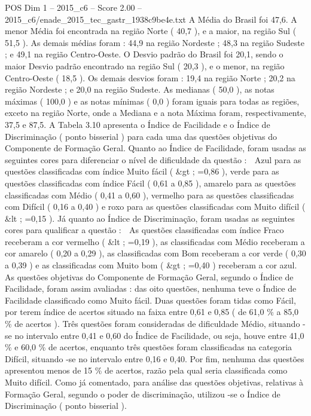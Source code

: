 \begin{textsample}{POS Dim 1 – 2015\_c6 – Score 2.00 – 2015\_c6/enade\_2015\_tec\_gastr\_1938c9be4e.txt}
A Média do Brasil foi 47,6.
A menor Média foi encontrada na região Norte ( 40,7 ), e a maior, na região Sul ( 51,5 ).
As demais médias foram : 44,9 na região Nordeste ; 48,3 na região Sudeste ; e 49,1 na região Centro-Oeste.
O Desvio padrão do Brasil foi 20,1, sendo o maior Desvio padrão encontrado na região Sul ( 20,3 ), e o menor, na região Centro-Oeste ( 18,5 ).
Os demais desvios foram : 19,4 na região Norte ; 20,2 na região Nordeste ; e 20,0 na região Sudeste.
As medianas ( 50,0 ), as notas máximas ( 100,0 ) e as notas mínimas ( 0,0 ) foram iguais para todas as regiões, exceto na região Norte, onde a Mediana e a nota Máxima foram, respectivamente, 37,5 e 87,5.
A Tabela 3.10 apresenta o Índice de Facilidade e o Índice de Discriminação ( ponto bisserial ) para cada uma das questões objetivas do Componente de Formação Geral.
Quanto ao Índice de Facilidade, foram usadas as seguintes cores para diferenciar o nível de dificuldade da questão :  Azul para as questões classificadas com índice Muito fácil ( \&gt ; =0,86 ), verde para as questões classificadas com índice Fácil ( 0,61 a 0,85 ), amarelo para as questões classificadas com Médio ( 0,41 a 0,60 ), vermelho para as questões classificadas com Difícil ( 0,16 a 0,40 ) e roxo para as questões classificadas com Muito difícil ( \&lt ; =0,15 ).
Já quanto ao Índice de Discriminação, foram usadas as seguintes cores para qualificar a questão :  As questões classificadas com índice Fraco receberam a cor vermelho ( \&lt ; =0,19 ), as classificadas com Médio receberam a cor amarelo ( 0,20 a 0,29 ), as classificadas com Bom receberam a cor verde ( 0,30 a 0,39 ) e as classificadas com Muito bom ( \&gt ; =0,40 ) receberam a cor azul.
As questões objetivas do Componente de Formação Geral, segundo o Índice de Facilidade, foram assim avaliadas : das oito questões, nenhuma teve o Índice de Facilidade classificado como Muito fácil.
Duas questões foram tidas como Fácil, por terem índice de acertos situado na faixa entre 0,61 e 0,85 ( de 61,0 \% a 85,0 \% de acertos ).
Três questões foram consideradas de dificuldade Médio, situando -se no intervalo entre 0,41 e 0,60 do Índice de Facilidade, ou seja, houve entre 41,0 \% e 60,0 \% de acertos, enquanto três questões foram classificadas na categoria Difícil, situando -se no intervalo entre 0,16 e 0,40.
Por fim, nenhuma das questões apresentou menos de 15 \% de acertos, razão pela qual seria classificada como Muito difícil.
Como já comentado, para análise das questões objetivas, relativas à Formação Geral, segundo o poder de discriminação, utilizou -se o Índice de Discriminação ( ponto bisserial ).

\end{textsample}
